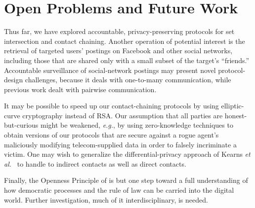 \section{Open Problems and Future Work}\label{sec-future}
Thus far, we have explored accountable, privacy-preserving protocols for
set intersection and contact chaining. 
Another operation of potential interest is the retrieval of
targeted users' postings on Facebook and other social networks, including 
those that are shared only with a small subset of the target's 
``friends.'' Accountable surveillance of social-network postings may present 
novel protocol-design challenges, because it deals with one-to-many 
communication, while previous work dealt with pairwise communication.

It may be possible to speed up our contact-chaining protocols by using
elliptic-curve cryptography instead of RSA. Our assumption that
all parties are honest-but-curious might be weakened, {\it e.g.}, by using 
zero-know\-ledge techniques to obtain versions
of our protocols that are secure against
a rogue agent's maliciously modifying telecom-supplied data in order
to falsely incriminate a victim. One may wish to
generalize the differential-privacy approach of Kearns {\it et 
al.}~\cite{krwy-pnas16} to handle to indirect contacts as well as
direct contacts.

Finally, the Openness Principle of \cite{sff-foci2014} is but one step
toward a full understanding of how democratic processes and the rule of law
can be carried into the digital world.  Further investigation, much of it
interdisciplinary, is needed.

%
